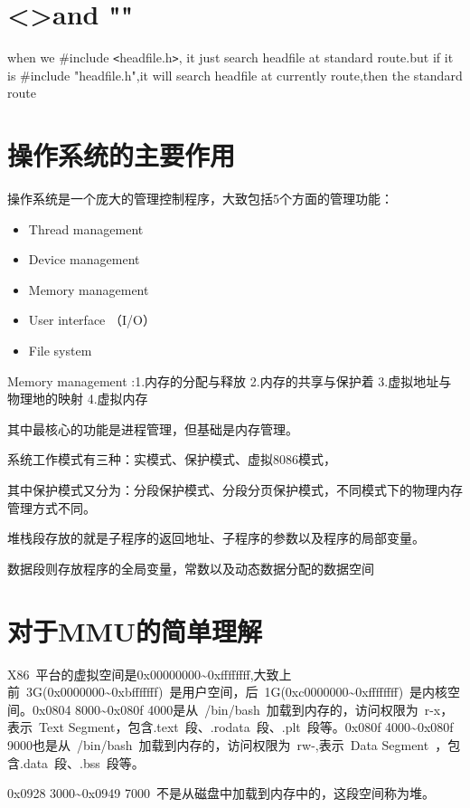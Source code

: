 \section{\textless \textgreater and ""}
when we \#include \verb|<|headfile.h\verb|>|, it just search headfile at standard route.but if it is \#include "headfile.h",it will search headfile at currently route,then the standard route

\section{操作系统的主要作用}
操作系统是一个庞大的管理控制程序，大致包括5个方面的管理功能：
\begin{itemize}
	\item Thread management 
	\item Device management
	\item Memory management
	\item User interface （I/O）
	\item File system
\end{itemize}

Memory management :1.内存的分配与释放 2.内存的共享与保护着 3.虚拟地址与物理地的映射 4.虚拟内存

其中最核心的功能是进程管理，但基础是内存管理。

系统工作模式有三种：实模式、保护模式、虚拟8086模式，

其中保护模式又分为：分段保护模式、分段分页保护模式，不同模式下的物理内存管理方式不同。

堆栈段存放的就是子程序的返回地址、子程序的参数以及程序的局部变量。

数据段则存放程序的全局变量，常数以及动态数据分配的数据空间

\section{对于MMU的简单理解}
X86~平台的虚拟空间是0x00000000\~{}0xffffffff,大致上前~3G(0x0000000\~{}0xbfffffff)~是用户空间，后~1G(0xc0000000\~{}0xffffffff)~是内核空间。0x0804 8000\~{}0x080f 4000是从~/bin/bash~加载到内存的，访问权限为~r-x，表示~Text Segment，包含.text~段、.rodata~段、.plt~段等。0x080f 4000\~{}0x080f 9000也是从~/bin/bash~加载到内存的，访问权限为~rw-,表示~Data Segment~，包含.data~段、.bss~段等。

0x0928 3000\~{}0x0949 7000~不是从磁盘中加载到内存中的，这段空间称为堆。

